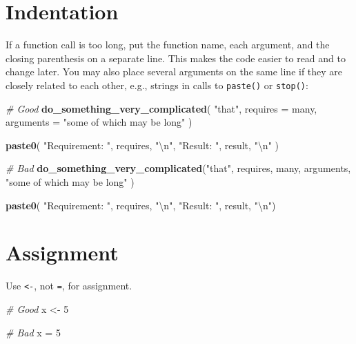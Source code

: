 \documentclass[]{book}
\newenvironment{Shaded}{\begin{snugshade}}{\end{snugshade}}
\newcommand{\KeywordTok}[1]{\textcolor[rgb]{0.13,0.29,0.53}{\textbf{{#1}}}}
\newcommand{\DataTypeTok}[1]{\textcolor[rgb]{0.13,0.29,0.53}{{#1}}}
\newcommand{\DecValTok}[1]{\textcolor[rgb]{0.00,0.00,0.81}{{#1}}}
\newcommand{\CharTok}[1]{\textcolor[rgb]{0.31,0.60,0.02}{{#1}}}
\newcommand{\StringTok}[1]{\textcolor[rgb]{0.31,0.60,0.02}{{#1}}}
\newcommand{\CommentTok}[1]{\textcolor[rgb]{0.56,0.35,0.01}{\textit{{#1}}}}
\newcommand{\NormalTok}[1]{{#1}}
\begin{document}
\section{Indentation}\label{indentation}

If a function call is too long, put the function name, each argument,
and the closing parenthesis on a separate line. This makes the code
easier to read and to change later. You may also place several arguments
on the same line if they are closely related to each other, e.g.,
strings in calls to \texttt{paste()} or \texttt{stop()}:

\begin{Shaded}
\begin{Highlighting}[]
\CommentTok{# Good}
\KeywordTok{do_something_very_complicated}\NormalTok{(}
  \StringTok{"that"}\NormalTok{,}
  \DataTypeTok{requires =} \NormalTok{many,}
  \DataTypeTok{arguments =} \StringTok{"some of which may be long"}
\NormalTok{)}

\KeywordTok{paste0}\NormalTok{(}
  \StringTok{"Requirement: "}\NormalTok{, requires, }\StringTok{"}\CharTok{\textbackslash{}n}\StringTok{"}\NormalTok{,}
  \StringTok{"Result: "}\NormalTok{, result, }\StringTok{"}\CharTok{\textbackslash{}n}\StringTok{"}
\NormalTok{)}

\CommentTok{# Bad}
\KeywordTok{do_something_very_complicated}\NormalTok{(}\StringTok{"that"}\NormalTok{, requires, many, arguments,}
                              \StringTok{"some of which may be long"}
                              \NormalTok{)}

\KeywordTok{paste0}\NormalTok{(}
  \StringTok{"Requirement: "}\NormalTok{, requires,}
  \StringTok{"}\CharTok{\textbackslash{}n}\StringTok{"}\NormalTok{, }\StringTok{"Result: "}\NormalTok{,}
  \NormalTok{result, }\StringTok{"}\CharTok{\textbackslash{}n}\StringTok{"}\NormalTok{)}
\end{Highlighting}
\end{Shaded}

\section{Assignment}\label{assignment}

Use \texttt{\textless{}-}, not \texttt{=}, for assignment.

\begin{Shaded}
\begin{Highlighting}[]
\CommentTok{# Good}
\NormalTok{x <-}\StringTok{ }\DecValTok{5}

\CommentTok{# Bad}
\NormalTok{x =}\StringTok{ }\DecValTok{5}
\end{Highlighting}
\end{Shaded}
\end{document}
